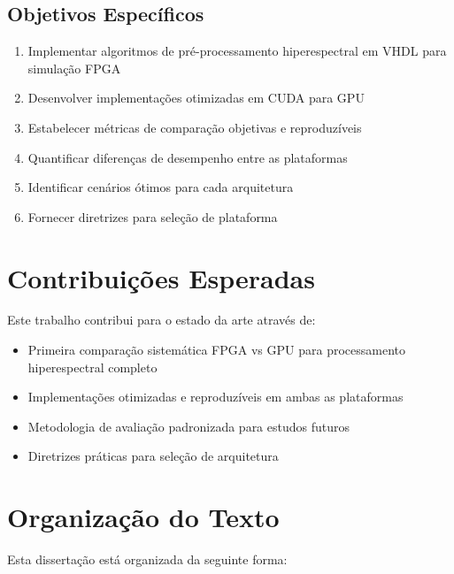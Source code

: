 \subsection{Objetivos Específicos}
\begin{enumerate}
    \item Implementar algoritmos de pré-processamento hiperespectral em VHDL para simulação FPGA
    \item Desenvolver implementações otimizadas em CUDA para GPU
    \item Estabelecer métricas de comparação objetivas e reproduzíveis
    \item Quantificar diferenças de desempenho entre as plataformas
    \item Identificar cenários ótimos para cada arquitetura
    \item Fornecer diretrizes para seleção de plataforma
\end{enumerate}


\section{Contribuições Esperadas}\label{sec:contribuicoes}

Este trabalho contribui para o estado da arte através de:
\begin{itemize}
    \item Primeira comparação sistemática FPGA vs GPU para processamento hiperespectral completo
    \item Implementações otimizadas e reproduzíveis em ambas as plataformas
    \item Metodologia de avaliação padronizada para estudos futuros
    \item Diretrizes práticas para seleção de arquitetura
\end{itemize}

\section{Organização do Texto}\label{sec:organizacao}

Esta dissertação está organizada da seguinte forma:

